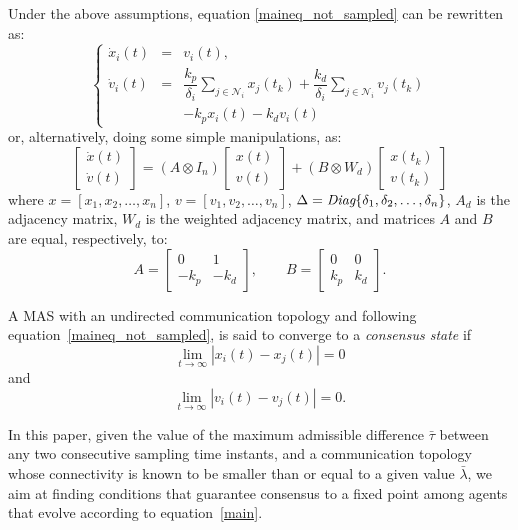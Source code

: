 \documentclass[conference]{IEEEtran}
\begin{document}
Under the above assumptions, equation \eqref{maineq_not_sampled} can be rewritten as:
\begin{equation}\label{eq_2_c}
\left\{
\begin{array}{lll}
 \dot{x}_i(t) & = & v_i(t),
\\
\dot{v}_i(t) & =  & \dfrac{k_p}{\delta_i}\sum_{j \in \mathcal{N}_i}x_j(t_k)+\dfrac{k_d}{\delta_i}\sum_{j \in \mathcal{N}_i}v_j(t_k) \\
 & & -k_p x_i(t)-k_d v_i(t)
\end{array}
\right.
\end{equation}
or, alternatively, doing some simple manipulations, as:
\begin{equation}\label{main}
\left[\begin{array}{c}
\dot{x}(t) \\
\dot{v}(t)
\end{array} \right]=(A\otimes I_n)\left[\begin{array}{c}
{x}(t) \\
{v}(t)
\end{array}\right]+(B\otimes W_d)\left[\begin{array}{c}
{x(t_k)} \\
{v(t_k)}
\end{array}\right]
\end{equation}
where $x=[x_1,x_2,\ldots, x_n]$, $v=[v_1,v_2,\ldots,v_n]$, $\Delta=\emph{Diag}\{\delta_1,\delta_2,\ldots, \delta_n\}$, $A_d$ is the adjacency matrix, $W_d$ is the weighted adjacency matrix, and matrices $A $ and $B$ are equal, respectively, to:
\begin{equation}\label{def:AB}
A=\left[\begin{array}{cc}
0 &1  \\
-k_p &-k_d
\end{array} \right], \qquad B=\left[\begin{array}{cc}
0 &0  \\
k_p &k_d
\end{array} \right].
\end{equation}


A MAS with an undirected communication topology and following equation~\eqref{maineq_not_sampled}, is said to converge to a \emph{consensus state} if $$\lim\limits_{t \to \infty }|x_i(t)-x_j(t)|=0$$ and $$\lim\limits_{t \to \infty }|v_i(t)-v_j(t)|=0.$$


In this paper, given the value of the maximum admissible difference $\bar{\tau}$ between any two consecutive sampling time instants, and a communication topology whose connectivity is known to be smaller than or equal to a given value $\bar \lambda$, we aim at finding conditions that guarantee consensus to a fixed point among agents that evolve according to equation~\eqref{main}.
\end{document}
